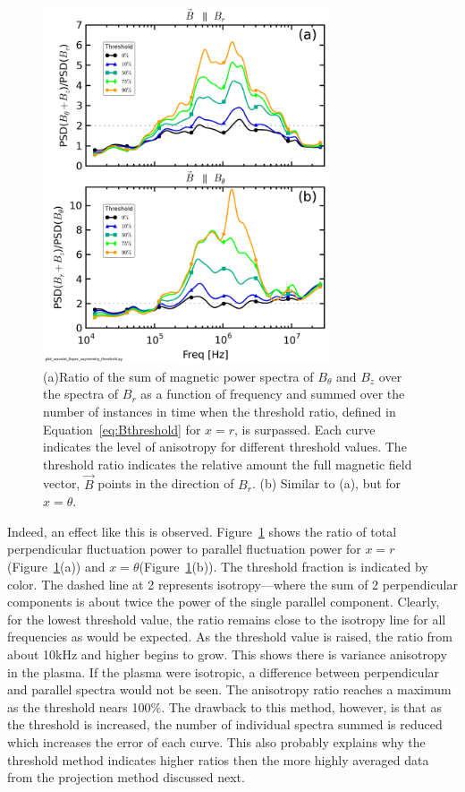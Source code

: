 \documentclass[aip,prl,amsmath,amssymb,reprint,superscriptaddress]{revtex4-1} %
\begin{document}
\begin{figure}[!htbp]
\centerline{
\includegraphics[width=8.5cm]{Bperppara_spectra_thresholdscan40t60us}}
\caption{\label{fig:thresholdmethod} (a)Ratio of the sum of magnetic power spectra of $B_{\theta}$ and $B_{z}$ over the spectra of $B_{r}$ as a function of frequency and summed over the number of instances in time when the threshold ratio, defined in Equation~\ref{eq:Bthreshold} for $x=r$, is surpassed. Each curve indicates the level of anisotropy for different threshold values. The threshold ratio indicates the relative amount the full magnetic field vector, $\vec{B}$ points in the direction of $B_{r}$. (b) Similar to (a), but for $x=\theta$.}
\end{figure}

Indeed, an effect like this is observed. Figure~\ref{fig:thresholdmethod} shows the ratio of total perpendicular fluctuation power to parallel fluctuation power for $x = r$(Figure~\ref{fig:thresholdmethod}(a)) and $x = \theta$(Figure~\ref{fig:thresholdmethod}(b)). The threshold fraction is indicated by color. The dashed line at 2 represents isotropy---where the sum of 2 perpendicular components is about twice the power of the single parallel component. Clearly, for the lowest threshold value, the ratio remains close to the isotropy line for all frequencies as would be expected. As the threshold value is raised, the ratio from about 10kHz and higher begins to grow. This shows there is variance anisotropy in the plasma. If the plasma were isotropic, a difference between perpendicular and parallel spectra would not be seen. The anisotropy ratio reaches a maximum as the threshold nears 100\%. The drawback to this method, however, is that as the threshold is increased, the number of individual spectra summed is reduced which increases the error of each curve. This also probably explains why the threshold method indicates higher ratios then the more highly averaged data from the projection method discussed next.
\end{document}
